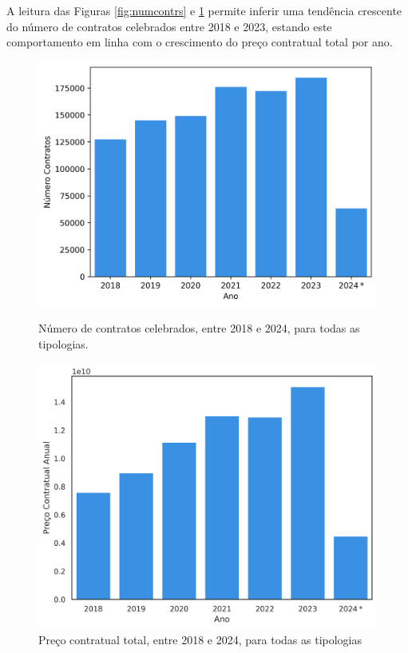 A leitura das Figuras \ref{fig:numcontrs} e \ref{fig:precoscontrs} permite inferir uma tendência crescente do número de contratos celebrados entre 2018 e 2023, estando este comportamento em linha com o crescimento do preço contratual total por ano. 

\begin{figure}[H]
	\centering
	\begin{minipage}{.49\linewidth}
		\includegraphics[width=\linewidth]{imagens/contratos_ano.png}
		\caption{Número de contratos celebrados, entre 2018 e 2024, para todas as tipologias.}
		\label{fig:numcontrs}
	\end{minipage}
	\hfill
	\begin{minipage}{.49\linewidth}
		\includegraphics[width=\linewidth]{imagens/precocontr_ano.png}
		\caption{Preço contratual total, entre 2018 e 2024, para todas as tipologias}
		\label{fig:precoscontrs}
	\end{minipage}
\end{figure}


